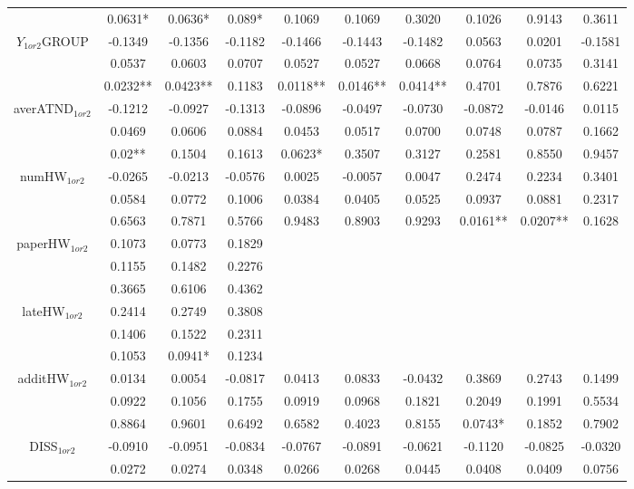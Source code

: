 \documentclass[]{article}
\begin{document}
\begin{landscape}
\begin{table}[htp]
\begin{adjustbox}{height=0.525\textheight,width=1.5\textwidth}
\begin{tabular}{c|ccc|ccc|ccc}
		& 0.0631* & 0.0636* & 0.089* & 0.1069 & 0.1069 & 0.3020 & 0.1026 & 0.9143 & 0.3611 \\
		$Y_{1or2}$GROUP & -0.1349 & -0.1356 & -0.1182 & -0.1466 & -0.1443 & -0.1482 & 0.0563 & 0.0201 & -0.1581 \\
		& 0.0537 & 0.0603 & 0.0707 & 0.0527 & 0.0527 & 0.0668 & 0.0764 & 0.0735 & 0.3141 \\
		& 0.0232** & 0.0423** & 0.1183 & 0.0118** & 0.0146** & 0.0414** & 0.4701 & 0.7876 & 0.6221 \\
		\hline
		averATND$_{1or2}$ & -0.1212 & -0.0927 & -0.1313 & -0.0896 & -0.0497 & -0.0730 & -0.0872 & -0.0146 & 0.0115 \\
		& 0.0469 & 0.0606 & 0.0884 & 0.0453 & 0.0517 & 0.0700 & 0.0748 & 0.0787 & 0.1662 \\
		& 0.02** & 0.1504 & 0.1613 & 0.0623* & 0.3507 & 0.3127 & 0.2581 & 0.8550 & 0.9457 \\
		numHW$_{1or2}$ & -0.0265 & -0.0213 & -0.0576 & 0.0025 & -0.0057 & 0.0047 & 0.2474 & 0.2234 & 0.3401 \\
		& 0.0584 & 0.0772 & 0.1006 & 0.0384 & 0.0405 & 0.0525 & 0.0937 & 0.0881 & 0.2317 \\
		& 0.6563 & 0.7871 & 0.5766 & 0.9483 & 0.8903 & 0.9293 & 0.0161** & 0.0207** & 0.1628 \\
		paperHW$_{1or2}$ & 0.1073 & 0.0773 & 0.1829 &  &  &  &  &  &  \\
		& 0.1155 & 0.1482 & 0.2276 &  &  &  &  &  &  \\
		& 0.3665 & 0.6106 & 0.4362 &  &  &  &  &  &  \\
		lateHW$_{1or2}$ & 0.2414 & 0.2749 & 0.3808 &  &  &  &  &  &  \\
		& 0.1406 & 0.1522 & 0.2311 &  &  &  &  &  &  \\
		& 0.1053 & 0.0941* & 0.1234 &  &  &  &  &  &  \\
		additHW$_{1or2}$ & 0.0134 & 0.0054 & -0.0817 & 0.0413 & 0.0833 & -0.0432 & 0.3869 & 0.2743 & 0.1499 \\
		& 0.0922 & 0.1056 & 0.1755 & 0.0919 & 0.0968 & 0.1821 & 0.2049 & 0.1991 & 0.5534 \\
		& 0.8864 & 0.9601 & 0.6492 & 0.6582 & 0.4023 & 0.8155 & 0.0743* & 0.1852 & 0.7902 \\
		DISS$_{1or2}$ & -0.0910 & -0.0951 & -0.0834 & -0.0767 & -0.0891 & -0.0621 & -0.1120 & -0.0825 & -0.0320 \\
		& 0.0272 & 0.0274 & 0.0348 & 0.0266 & 0.0268 & 0.0445 & 0.0408 & 0.0409 & 0.0756 \\

\end{tabular}
\end{adjustbox}
\end{table}
\end{landscape}
\end{document}

